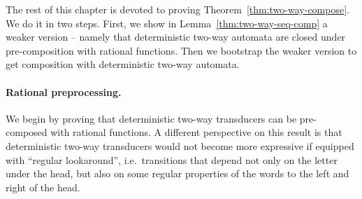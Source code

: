 The rest of this chapter is devoted to proving Theorem~\ref{thm:two-way-compose}.
We do it in two steps. First, we show in Lemma~\ref{thm:two-way-seq-comp} a weaker version -- namely that deterministic two-way automata are closed under pre-composition with rational functions.  Then we bootstrap the weaker version to get composition with deterministic two-way automata.

\paragraph*{Rational preprocessing.}  We begin by proving that deterministic two-way transducers can be pre-composed with rational functions.
A different perspective on this result is that deterministic two-way transducers would not become more expressive if  equipped with ``regular lookaround'', i.e.~transitions that depend not only on the letter under the head, but also on some regular properties of the words to the left and right of the head.

